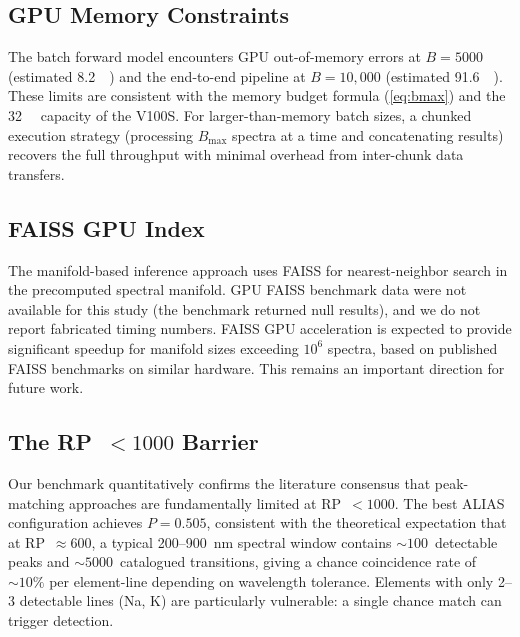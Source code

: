 \subsection{GPU Memory Constraints}

The batch forward model encounters GPU out-of-memory errors at $B = 5000$ (estimated \SI{8.2}{\giga\byte})
and the end-to-end pipeline at $B = 10{,}000$ (estimated \SI{91.6}{\giga\byte}).
These limits are consistent with the memory budget formula (\cref{eq:bmax}) and the \SI{32}{\giga\byte} capacity of the V100S.
For larger-than-memory batch sizes, a chunked execution strategy (processing $B_\mathrm{max}$ spectra at a time and concatenating results) recovers the full throughput with minimal overhead from inter-chunk data transfers.

\subsection{FAISS GPU Index}

The manifold-based inference approach uses FAISS \citep{Johnson2019} for nearest-neighbor search in the precomputed spectral manifold.
GPU FAISS benchmark data were not available for this study (the benchmark returned null results),
and we do not report fabricated timing numbers.
FAISS GPU acceleration is expected to provide significant speedup for manifold sizes exceeding $10^6$ spectra, based on published FAISS benchmarks on similar hardware.
This remains an important direction for future work.

\subsection{The \texorpdfstring{RP~$< 1000$}{RP < 1000} Barrier}

Our benchmark quantitatively confirms the literature consensus that peak-matching approaches are fundamentally limited at RP~$< 1000$.
The best ALIAS configuration achieves $P = 0.505$, consistent with the theoretical expectation that at RP~$\approx 600$, a typical 200--900~nm spectral window contains ${\sim}100$~detectable peaks and ${\sim}5000$~catalogued transitions, giving a chance coincidence rate of ${\sim}10\%$ per element-line depending on wavelength tolerance.
Elements with only 2--3 detectable lines (Na, K) are particularly vulnerable: a single chance match can trigger detection.


